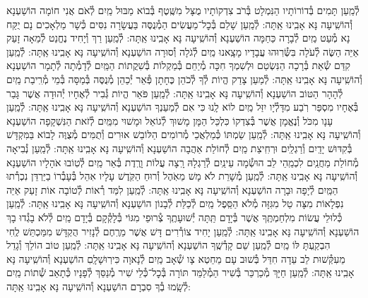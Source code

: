 \documentclass[twoside, openany, parskip=half, 11pt]{book}
\begin{document}
\begin{small}
לְ֯מַֽעַן תָּמִים בְּ֯דוֹרוֹתָיו הַנִּמְלָט בְּ֯רֹב צִדְקוֹתָיו
מֻצָּל מִשֶּֽׁטֶף בְּ֯בוֹא מַבּוּל מַֽיִם לְ֯אֹם אֲנִי חוֹמָה הוֹשַׁעְנָא וְ֯הוֹשִֽׁיעָה נָּא אָבִֽינוּ אַֽתָּה:
לְ֯מַֽעַן שָׁלֵם בְּ֯כׇל־מַעֲשִׂים הַמְ֯נֻסֶּה בַּעֲשָׂרָה נִסִּים
כְּ֯שָׁר מַלְאָכִים נָם יֻקַּח נָא מְ֯עַט מַֽיִם לְ֯בָרָה כַּחַמָּה הוֹשַׁעְנָא וְ֯הוֹשִֽׁיעָה נָּא אָבִֽינוּ אַֽתָּה:
לְ֯מַֽעַן רַךְ וְ֯יָחִיד נֶחֱנַט לְ֯מֵאָה זָעַק אַיֵּה הַשֶּׂה לְ֯עֹלָה
בִּשְּׂ֯רֽוּהוּ עֲבָדָיו מָצָֽאנוּ מַֽיִם לְ֯גֹלָה וְ֯סוּרָה הוֹשַׁעְנָא וְ֯הוֹשִֽׁיעָה נָּא אָבִֽינוּ אַֽתָּה:
לְ֯מַֽעַן קִדַּם שְׂ֯אֵת בְּ֯רָכָה הַנִּשְׂטַם וּלְשִׁמְךָ חִכָּה
מְ֯יַחֵם בְּ֯מַקְלוֹת בְּ֯שִׁקֲתוֹת הַמַּֽיִם לְ֯דָמְ֯תָה לְ֯תָמָר הוֹשַׁעְנָא וְ֯הוֹשִֽׁיעָה נָּא אָבִֽינוּ אַֽתָּה:
לְ֯מַעַן צָדַק הֱיוֹת לְ֯ךָ לְ֯כֹהֵן כֶּחָתָן פְּ֯אֵר יְ֯כַהֵן
מְ֯נֻסֶּה בְּ֯מַסָּה בְּ֯מֵי מְ֯רִֽיבַת מַֽיִם לְ֯הָהָר הַטּוֹב הוֹשַׁעְנָא וְ֯הוֹשִֽׁיעָה נָּא אָבִֽינוּ אַֽתָּה:
לְ֯מַֽעַן פֹּאַר הֱיוֹת גְּ֯בִיר לְ֯אֶחָיו יְ֯הוּדָה אֲשֶׁר גָּבַר בְּ֯אֶחָיו
מִסְפַּר רֹֽבַע מִדָּלְ֯יָו יִזַּל מַֽיִם לוֹא לָֽנוּ כִּי אִם לְ֯מַעַנְךָ הוֹשַׁעְנָא וְ֯הוֹשִֽׁיעָה נָּא אָבִֽינוּ אַֽתָּה:
לְ֯מַֽעַן עָנָו מִכֹּל וְ֯נֶאֱמָן אֲשֶׁר בְּ֯צִדְקוֹ כִּלְכֵּל הַמָּן
מָשׁוּךְ לְ֯גוֹאֵל וּמָשׁוּי מִמַּֽיִם לְ֯זֹאת הַנִּשְׁקָפָה הוֹשַׁעְנָא וְ֯הוֹשִֽׁיעָה נָּא אָבִֽינוּ אַֽתָּה:
לְ֯מַֽעַן שַׂמְתּוֹ כְּ֯מַלְאֲכֵי מְ֯רוֹמִים הַלּוֹבֵשׁ אוּרִים וְ֯תֻמִּים
מְ֯צֻוֶּה לָבוֹא בַּמִּקְדָּשׁ בְּ֯קִדּוּשׁ יָדַֽיִם וְ֯רַגְלַֽיִם וּרְחִֽיצַת מַֽיִם
לְ֯חוֹלַת אַהֲבָה הוֹשַׁעְנָא וְ֯הוֹשִֽׁיעָה נָּא אָבִֽינוּ אַֽתָּה:
לְ֯מַֽעַן נְ֯בִיאָה מְ֯חוֹלַת מַחֲנַֽיִם לִכְמֵֽהֵי לֵב הוּשְׂ֯מָה עֵינַֽיִם
לְ֯רַגְלָהּ רָֽצָה עֲלוֹת וָרֶֽדֶת בְּ֯אֵר מַֽיִם לְ֯טֽוֹבוּ אֹהָלָיו הוֹשַׁעְנָא וְ֯הוֹשִֽׁיעָה נָּא אָבִֽינוּ אַֽתָּה:
לְ֯מַֽעַן מְ֯שָׁרֵת לֹא מָשׁ מֵאֹֽהֶל וְ֯רוּחַ הַקֹּֽדֶשׁ עָלָיו אִהֵל
בְּ֯עָבְ֯רוֹ בַיַּרְדֵּן נִכְרְ֯תוּ הַמַּֽיִם לְ֯יָפָה וּבָרָה הוֹשַׁעְנָא וְ֯הוֹשִֽׁיעָה נָּא אָבִֽינוּ אַֽתָּה:
לְ֯מַֽעַן לִמַּד רְ֯אוֹת לְ֯טוֹבָה אוֹת זָעַק אַיֵּה נִפְלָאוֹת
מִצָּה טַל מִגִּזָּה מְ֯לֹא הַסֵּֽפֶל מַֽיִם לְ֯כַלַּת לְ֯בָנוֹן הוֹשַׁעְנָא וְ֯הוֹשִֽׁיעָה נָּא אָבִֽינוּ אַֽתָּה:
לְ֯מַֽעַן כְּ֯לוּלֵי עֲשׂוֹת מִלְחַמְתֶּֽךָ אֲשֶׁר בְּ֯יָדָם תַּֽתָּה יְ֯שׁוּעָתֶֽךָ
צְ֯רוּפֵי מִגּוֹי בְּ֯לָקְ֯קָם בְּ֯יָדָם מַֽיִם לְ֯לֹא בָגְ֯דוּ בָךְ הוֹשַׁעְנָא וְ֯הוֹשִֽׁיעָה נָּא אָבִֽינוּ אַֽתָּה:
לְ֯מַֽעַן יָחִיד צוֹרְ֯רִים דָּשׁ אֲשֶׁר מֵרֶֽחֶם לְ֯נָזִיר הֻקְדָּשׁ
מִמַּכְתֵּשׁ לֶֽחִי הִבְקַֽעְתָּ לּוֹ מַֽיִם לְ֯מַֽעַן שֵׁם קָדְ֯שֶֽׁךָ הוֹשַׁעְנָא וְ֯הוֹשִֽׁיעָה נָּא אָבִֽינוּ אַֽתָּה:
לְ֯מַֽעַן טוֹב הוֹלֵךְ וְ֯גָדֵל מֵעִקְּ֯שׁוּת לֵב עֵדָה חִדֵּל
בְּ֯שׁוּב עָם מֵחֵטְא צָו שְׁ֯אָב מַֽיִם לְ֯נָאוָה כִּירֽוּשָׁלָֽםִ הוֹשַׁעְנָא וְ֯הוֹשִֽׁיעָה נָּא אָבִֽינוּ אַֽתָּה:
לְ֯מַֽעַן חַיָּךְ מְ֯כַרְכֵּר בְּ֯שִׁיר הַמְ֯לַמֵּד תּוֹרָה בְּ֯כׇל־כְּ֯לֵי שִׁיר
מְ֯נַסֵּךְ לְ֯פָנָיו כְּ֯תָאַב שְׁ֯תוֹת מַֽיִם לְ֯שָֽׂמוּ בְ֯ךָ סִבְרָם הוֹשַׁעְנָא וְ֯הוֹשִֽׁיעָה נָּא אָבִֽינוּ אַֽתָּה:

\end{small}
\end{document}
